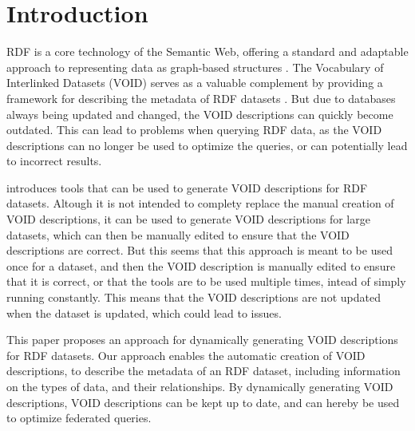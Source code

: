 \section{Introduction}\label{sec:introduction}
RDF is a core technology of the Semantic Web, offering a standard and adaptable approach to representing data as graph-based structures \cite{the web of data}. The Vocabulary of Interlinked Datasets (VOID) serves as a valuable complement by providing a framework for describing the metadata of RDF datasets \cite{Cheng og Harting}. But due to databases always being updated and changed, the VOID descriptions can quickly become outdated. This can lead to problems when querying RDF data, as the VOID descriptions can no longer be used to optimize the queries, or can potentially lead to incorrect results.

\cite{Creating VOID descriptions for Web-scale Data} introduces tools that can be used to generate VOID descriptions for RDF datasets. Altough it is not intended to complety replace the manual creation of VOID descriptions, it can be used to generate VOID descriptions for large datasets, which can then be manually edited to ensure that the VOID descriptions are correct. But this seems  that this approach is meant to be used once for a dataset, and then the VOID description is manually edited to ensure that it is correct, or that the tools are to be used multiple times, intead of simply running constantly. This means that the VOID descriptions are not updated when the dataset is updated, which could lead to issues.

This paper proposes an approach for dynamically generating VOID descriptions for RDF datasets. Our approach enables the automatic creation of VOID descriptions, to describe the metadata of an RDF dataset, including information on the types of data, and their relationships. By dynamically generating VOID descriptions, VOID descriptions can be kept up to date, and can hereby be used to optimize federated queries. 




